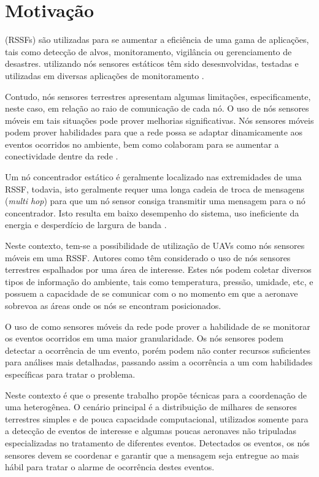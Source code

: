 
\section{Motivação}
\wsn (RSSFs) são utilizadas para se aumentar a eficiência de uma gama de
aplicações, tais como detecção de alvos, monitoramento, vigilância ou
gerenciamento de desastres. \rssfs utilizando nós sensores estáticos têm sido
desesnvolvidas, testadas e utilizadas em diversas aplicações de monitoramento
\cite{Mainwaring2002}.

Contudo, nós sensores terrestres apresentam algumas limitações, especificamente,
neste caso, em relação ao raio de comunicação de cada nó. O uso de nós sensores
móveis em tais situações pode prover melhorias significativas. Nós sensores
móveis podem prover habilidades para que a rede possa se adaptar dinamicamente
aos eventos ocorridos no ambiente, bem como colaboram para se aumentar a
conectividade dentre da rede  \cite{Aware}.

Um nó concentrador estático é geralmente localizado nas extremidades de uma
RSSF, todavia, isto geralmente requer uma longa cadeia de troca de mensagens
(\emph{multi hop}) para que um nó sensor consiga transmitir uma mensagem para o
nó concentrador. Isto resulta em baixo desempenho do sistema, uso ineficiente da
energia e desperdício de largura de banda \cite{Chang2007}.

Neste contexto, tem-se a possibilidade de utilização de UAVs como nós sensores
móveis em uma RSSF. Autores como \cite{Lucchi2007} têm considerado o uso de nós
sensores terrestres espalhados por uma área de interesse. Estes nós podem
coletar diversos tipos de informação do ambiente, tais como temperatura,
pressão, umidade, etc, e possuem a capacidade de se comunicar com o \vant no
momento em que a aeronave sobrevoa as áreas onde os nós se encontram
posicionados.

O uso de \vants como sensores móveis da rede pode prover a habilidade de se
monitorar os eventos ocorridos em uma maior granularidade. Os nós sensores podem
detectar a ocorrência de um evento, porém podem não conter recursos suficientes
para análises mais detalhadas, passando assim a ocorrência a um \vant com
habilidades específicas para tratar o problema.

Neste contexto é que o presente trabalho propõe técnicas para a coordenação de
uma \rssf heterogênea. O cenário principal é a distribuição de milhares de
sensores terrestres simples e de pouca capacidade computacional, utilizados
somente para a detecção de eventos de interesse e algumas poucas aeronaves não
tripuladas especializadas no tratamento de diferentes eventos. Detectados os
eventos, os nós sensores devem se coordenar e garantir que a mensagem seja
entregue ao \vant mais hábil para tratar o alarme de ocorrência destes eventos.


